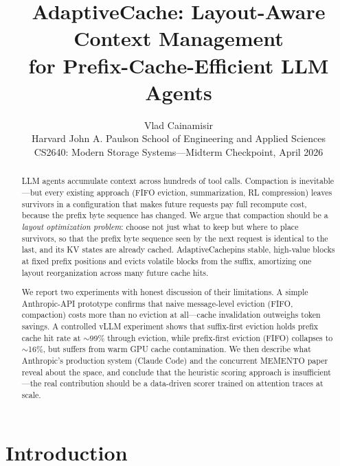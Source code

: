 \documentclass[letterpaper,twocolumn,10pt]{article}
\newcommand{\sysname}{AdaptiveCache}
\begin{document}
\date{}

\title{\Large \bf AdaptiveCache: Layout-Aware Context Management\\
       for Prefix-Cache-Efficient LLM Agents}

\author{
  {\rm Vlad Cainamisir}\\
  Harvard John A. Paulson School of Engineering and Applied Sciences\\
  {\small CS2640: Modern Storage Systems\quad---\quad Midterm Checkpoint, April 2026}
}

\maketitle

\begin{abstract}
LLM agents accumulate context across hundreds of tool calls. Compaction is
inevitable---but every existing approach (FIFO eviction, summarization, RL
compression) leaves survivors in a configuration that makes future requests
pay full recompute cost, because the prefix byte sequence has changed. We
argue that compaction should be a \emph{layout optimization problem}: choose
not just what to keep but where to place survivors, so that the prefix byte
sequence seen by the next request is identical to the last, and its KV states
are already cached. \sysname pins stable, high-value blocks at fixed prefix
positions and evicts volatile blocks from the suffix, amortizing one layout
reorganization across many future cache hits.

We report two experiments with honest discussion of their limitations. A
simple Anthropic-API prototype confirms that naive message-level eviction
(FIFO, compaction) costs more than no eviction at all---cache invalidation
outweighs token savings. A controlled vLLM experiment shows that suffix-first
eviction holds prefix cache hit rate at $\sim$99\% through eviction, while
prefix-first eviction (FIFO) collapses to $\sim$16\%, but suffers from warm
GPU cache contamination. We then describe what Anthropic's production system
(Claude Code) and the concurrent MEMENTO paper reveal about the space, and
conclude that the heuristic scoring approach is insufficient---the real
contribution should be a data-driven scorer trained on attention traces at
scale.
\end{abstract}

\section{Introduction}
\end{document}
